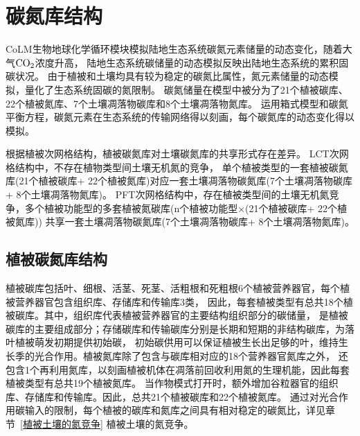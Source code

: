 \chapter{碳氮库结构}\label{碳氮库结构}

CoLM生物地球化学循环模块模拟陆地生态系统碳氮元素储量的动态变化，随着大气$\rm CO_2$浓度升高，
陆地生态系统碳储量的动态模拟反映出陆地生态系统的累积固碳状况。
由于植被和土壤均具有较为稳定的碳氮比属性，氮元素储量的动态模拟，量化了生态系统固碳的氮限制。
碳氮储量在模型中被分为了21个植被碳库、22个植被氮库、7个土壤凋落物碳库和8个土壤凋落物氮库。
运用箱式模型和碳氮平衡方程，碳氮元素在生态系统的传输网络得以刻画，每个碳氮库的动态变化得以模拟。


根据植被次网格结构，植被碳氮库对土壤碳氮库的共享形式存在差异。
LCT次网格结构中，不存在植物类型间土壤无机氮的竞争，
单个植被类型的一套植被碳氮库(21个植被碳库+ 22个植被氮库)对应一套土壤凋落物碳氮库(7个土壤凋落物碳库+ 8个土壤凋落物氮库)。
PFT次网格结构中，存在植被类型间的土壤无机氮竞争，多个植被功能型的多套植被氮碳库(n个植被功能型×(21个植被碳库+ 22个植被氮库))
共享一套土壤凋落物碳氮库(7个土壤凋落物碳库+ 8个土壤凋落物氮库)。


\section{植被碳氮库结构}\label{植被碳氮库结构}
植被碳库包括叶、细根、活茎、死茎、活粗根和死粗根6个植被营养器官，每个植被营养器官包含组织库、存储库和传输库3类，
因此，每套植被类型有总共18个植被碳库。其中，组织库代表植被营养器官的主要结构组织部分的碳储量，
是植被碳库的主要组成部分；存储碳库和传输碳库分别是长期和短期的非结构碳库，为落叶植被萌发初期提供初始碳，
初始碳供用可以保证植被生长出足够的叶，维持生长季的光合作用。植被氮库除了包含与碳库相对应的18个营养器官氮库之外，
还包含1个再利用氮库，以刻画植被机体在凋落前回收利用氮的生理机能，因此每套植被类型有总共19个植被氮库。
当作物模式打开时，额外增加谷粒器官的组织库、存储库和传输库。因此，总共21个植被碳库和22个植被氮库。
通过对光合作用碳输入的限制，每个植被的碳库和氮库之间具有相对稳定的碳氮比，详见章节~\ref{植被土壤的氮竞争} 植被土壤的氮竞争。

